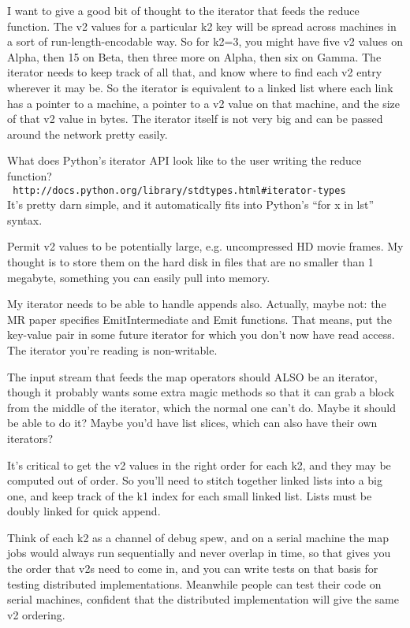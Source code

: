 \documentclass[11pt]{article}
\begin{document}
I want to give a good bit of thought to the iterator that feeds the
reduce function. The v2 values for a particular k2 key will be spread
across machines in a sort of run-length-encodable way. So for k2=3,
you might have five v2 values on Alpha, then 15 on Beta, then three
more on Alpha, then six on Gamma. The iterator needs to keep track
of all that, and know where to find each v2 entry wherever it may be.
So the iterator is equivalent to a linked list where each link has a
pointer to a machine, a pointer to a v2 value on that machine, and the
size of that v2 value in bytes. The iterator itself is not very big
and can be passed around the network pretty easily.

What does Python's iterator API look like to the user writing the
reduce function? \\ {\tt
  http://docs.python.org/library/stdtypes.html\#iterator-types}
\\ It's pretty darn simple, and it automatically fits into Python's
``for x in lst'' syntax.

Permit v2 values to be potentially large, e.g. uncompressed HD movie
frames. My thought is to store them on the hard disk in files that are
no smaller than 1 megabyte, something you can easily pull into memory.

My iterator needs to be able to handle appends also. Actually, maybe
not: the MR paper specifies EmitIntermediate and Emit functions. That
means, put the key-value pair in some future iterator for which you
don't now have read access. The iterator you're reading is
non-writable.

The input stream that feeds the map operators should ALSO be an
iterator, though it probably wants some extra magic methods so that it
can grab a block from the middle of the iterator, which the normal one
can't do. Maybe it should be able to do it? Maybe you'd have list
slices, which can also have their own iterators?

It's critical to get the v2 values in the right order for each k2, and
they may be computed out of order. So you'll need to stitch together
linked lists into a big one, and keep track of the k1 index for each
small linked list. Lists must be doubly linked for quick append.

Think of each k2 as a channel of debug spew, and on a serial machine
the map jobs would always run sequentially and never overlap in time,
so that gives you the order that v2s need to come in, and you can
write tests on that basis for testing distributed implementations.
Meanwhile people can test their code on serial machines, confident
that the distributed implementation will give the same v2 ordering.
\end{document}
